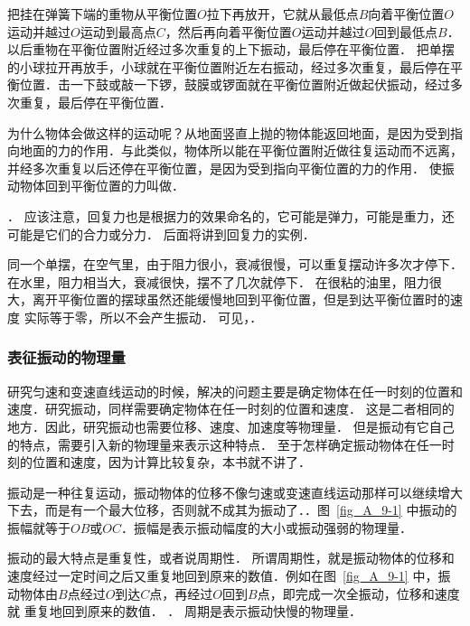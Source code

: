 把挂在弹簧下端的重物从平衡位置$O$拉下再放开，它就从最低点$B$向着平衡位置$O$运动并越过$O$运动到最高点$C$，然后再向着平衡位置$O$运动并越过$O$回到最低点$B$．以后重物在平衡位置附近经过多次重复的上下振动，最后停在平衡位置．
把单摆的小球拉开再放手，小球就在平衡位置附近左右振动，经过多次重复，最后停在平衡位置．击一下鼓或敲一下锣，鼓膜或锣面就在平衡位置附近做起伏振动，经过多次重复，最后停在平衡位置．

为什么物体会做这样的运动呢？从地面竖直上抛的物体能返回地面，是因为受到指向地面的力的作用．与此类似，物体所以能在平衡位置附近做往复运动而不远离，并经多次重复以后还停在平衡位置，是因为受到指向平衡位置的力的作用．
使振动物体回到平衡位置的力叫做．

．
应该注意，回复力也是根据力的效果命名的，它可能是弹力，可能是重力，还可能是它们的合力或分力．
后面将讲到回复力的实例．

同一个单摆，在空气里，由于阻力很小，衰减很慢，可以重复摆动许多次才停下．在水里，阻力相当大，衰减很快，摆不了几次就停下．
在很粘的油里，阻力很大，离开平衡位置的摆球虽然还能缓慢地回到平衡位置，但是到达平衡位置时的速度
实际等于零，所以不会产生振动．
可见，．

\subsubsection{表征振动的物理量}

研究匀速和变速直线运动的时候，解决的问题主要是确定物体在任一时刻的位置和速度．研究振动，同样需要确定物体在任一时刻的位置和速度．
这是二者相同的地方．因此，研究振动也需要位移、速度、加速度等物理量．
但是振动有它自己的特点，需要引入新的物理量来表示这种特点．
至于怎样确定振动物体在任一时刻的位置和速度，因为计算比较复杂，本书就不讲了．

振动是一种往复运动，振动物体的位移不像匀速或变速直线运动那样可以继续增大下去，而是有一个最大位移，否则就不成其为振动了．．图~\ref{fig_A_9-1} 中振动的振幅就等于$OB$或$OC$．振幅是表示振动幅度的大小或振动强弱的物理量．




振动的最大特点是重复性，或者说周期性．
所谓周期性，就是振动物体的位移和速度经过一定时间之后又重复地回到原来的数值．例如在图~\ref{fig_A_9-1} 中，振动物体由$B$点经过$O$到达$C$点，再经过$O$回到$B$点，即完成一次全振动，位移和速度就
重复地回到原来的数值．
．
周期是表示振动快慢的物理量．

